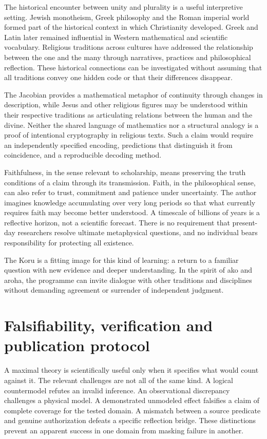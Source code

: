 \documentclass[11pt,a4paper]{article}
\begin{document}
The historical encounter between unity and plurality is a useful interpretive setting. Jewish monotheism, Greek philosophy and the Roman imperial world formed part of the historical context in which Christianity developed. Greek and Latin later remained influential in Western mathematical and scientific vocabulary. Religious traditions across cultures have addressed the relationship between the one and the many through narratives, practices and philosophical reflection. These historical connections can be investigated without assuming that all traditions convey one hidden code or that their differences disappear.

The Jacobian provides a mathematical metaphor of continuity through changes in description, while Jesus and other religious figures may be understood within their respective traditions as articulating relations between the human and the divine. Neither the shared language of mathematics nor a structural analogy is a proof of intentional cryptography in religious texts. Such a claim would require an independently specified encoding, predictions that distinguish it from coincidence, and a reproducible decoding method.

Faithfulness, in the sense relevant to scholarship, means preserving the truth conditions of a claim through its transmission. Faith, in the philosophical sense, can also refer to trust, commitment and patience under uncertainty. The author imagines knowledge accumulating over very long periods so that what currently requires faith may become better understood. A timescale of billions of years is a reflective horizon, not a scientific forecast. There is no requirement that present-day researchers resolve ultimate metaphysical questions, and no individual bears responsibility for protecting all existence.

The Koru is a fitting image for this kind of learning: a return to a familiar question with new evidence and deeper understanding. In the spirit of ako and aroha, the programme can invite dialogue with other traditions and disciplines without demanding agreement or surrender of independent judgment.
\section{Falsifiability, verification and publication protocol}
A maximal theory is scientifically useful only when it specifies what would count against it. The relevant challenges are not all of the same kind. A logical countermodel refutes an invalid inference. An observational discrepancy challenges a physical model. A demonstrated unmodeled effect falsifies a claim of complete coverage for the tested domain. A mismatch between a source predicate and genuine authorization defeats a specific reflection bridge. These distinctions prevent an apparent success in one domain from masking failure in another.
\end{document}

